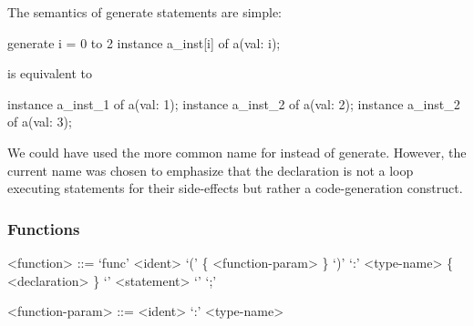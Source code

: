 The semantics of {\ttfamily generate} statements are simple:
\begin{smeilcode}
generate i = 0 to 2 {
  instance a_inst[i] of a(val: i);
}
\end{smeilcode}
is equivalent to
\begin{smeilcode}
instance a_inst_1 of a(val: 1);
instance a_inst_2 of a(val: 2);
instance a_inst_2 of a(val: 3);
\end{smeilcode}

We could have used the more common name {\ttfamily for} instead of {\ttfamily
  generate}. However, the current name was chosen to emphasize that the
declaration is not a loop executing statements for their side-effects but rather
a code-generation construct.

\subsubsection{Functions}
\begin{grammar}
  <function> ::= `func' <ident> `(' \{ <function-param> \} `)' `:' <type-name>
  \{ <declaration> \} `{' { <statement> } `}' `;'

  <function-param> ::= <ident> `:' <type-name>
\end{grammar}


